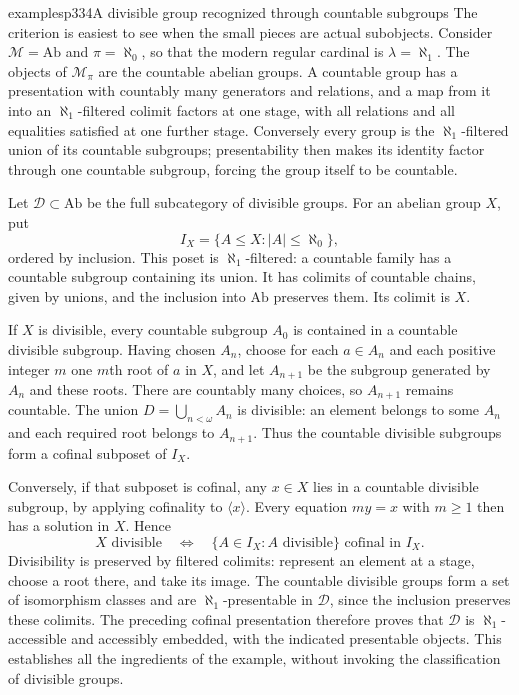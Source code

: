 \begin{dcomment}{examples}{p334}{A divisible group recognized through countable subgroups}
The criterion is easiest to see when the small pieces are actual subobjects. Consider $\mathcal M=\mathrm{Ab}$ and $\pi=\aleph_0$, so that the modern regular cardinal is $\lambda=\aleph_1$. The objects of $\mathcal M_\pi$ are the countable abelian groups. A countable group has a presentation with countably many generators and relations, and a map from it into an $\aleph_1$-filtered colimit factors at one stage, with all relations and all equalities satisfied at one further stage. Conversely every group is the $\aleph_1$-filtered union of its countable subgroups; presentability then makes its identity factor through one countable subgroup, forcing the group itself to be countable.

Let $\mathcal D\subset\mathrm{Ab}$ be the full subcategory of divisible groups. For an abelian group $X$, put
\[
 I_X=\{A\leq X:\lvert A\rvert\leq\aleph_0\},
\]
ordered by inclusion. This poset is $\aleph_1$-filtered: a countable family has a countable subgroup containing its union. It has colimits of countable chains, given by unions, and the inclusion into $\mathrm{Ab}$ preserves them. Its colimit is $X$.

If $X$ is divisible, every countable subgroup $A_0$ is contained in a countable divisible subgroup. Having chosen $A_n$, choose for each $a\in A_n$ and each positive integer $m$ one $m$th root of $a$ in $X$, and let $A_{n+1}$ be the subgroup generated by $A_n$ and these roots. There are countably many choices, so $A_{n+1}$ remains countable. The union $D=\bigcup_{n<\omega}A_n$ is divisible: an element belongs to some $A_n$ and each required root belongs to $A_{n+1}$. Thus the countable divisible subgroups form a cofinal subposet of $I_X$.

Conversely, if that subposet is cofinal, any $x\in X$ lies in a countable divisible subgroup, by applying cofinality to $\langle x\rangle$. Every equation $my=x$ with $m\geq1$ then has a solution in $X$. Hence
\[
 X\text{ divisible}\quad\Longleftrightarrow\quad
 \{A\in I_X:A\text{ divisible}\}\text{ cofinal in }I_X.
\]
Divisibility is preserved by filtered colimits: represent an element at a stage, choose a root there, and take its image. The countable divisible groups form a set of isomorphism classes and are $\aleph_1$-presentable in $\mathcal D$, since the inclusion preserves these colimits. The preceding cofinal presentation therefore proves that $\mathcal D$ is $\aleph_1$-accessible and accessibly embedded, with the indicated presentable objects. This establishes all the ingredients of the example, without invoking the classification of divisible groups.


\end{dcomment}
